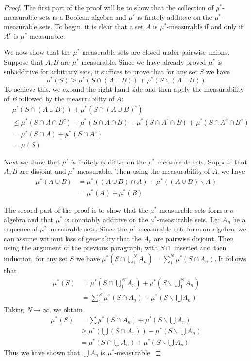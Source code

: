 \documentclass[11pt,oneside]{amsbook}
\renewcommand{\setminus}{\smallsetminus}
\theoremstyle{definition}
\theoremstyle{plain}
\theoremstyle{definition}
\theoremstyle{remark}
\numberwithin{equation}{section}
\numberwithin{figure}{section}
\begin{document}
\begin{proof}
  The first part of the proof will be to show that the collection of $\mu^*$-measurable sets is a Boolean algebra and $\mu^*$ is finitely additive on the $\mu^*$-measurable sets. To begin, it is clear that a set $A$ is $\mu^*$-measurable if and only if $A^c$ is $\mu^*$-measurable.

  We now show that the $\mu^*$-measurable sets are closed under pairwise unions. Suppose that $A,B$ are $\mu^*$-measurable. Since we have already proved $\mu^*$ is subadditive for arbitrary sets, it suffices to prove that for any set $S$ we have
  \[\mu^*(S)\geq\mu^*(S\cap(A\cup B))+\mu^*(S\setminus(A\cup B))
  \]
  To achieve this, we expand the right-hand side and then apply the measurability of $B$ followed by the measurability of $A$:
  \begin{align*}
    &\mu^*(S\cap(A\cup B))+\mu^*(S\cap(A\cup B)^c)\\
    &\leq \mu^*(S\cap A\cap B^c)+\mu^*(S\cap A\cap B)+\mu^*(S\cap A^c\cap B)+\mu^*(S\cap A^c\cap B^c)\\
    &=\mu^*(S\cap A)+\mu^*(S\cap A^c)\\
    &=\mu(S)
  \end{align*}

  Next we show that $\mu^*$ is finitely additive on the $\mu^*$-measurable sets. Suppose that $A,B$ are disjoint and $\mu^*$-measurable. Then using the measurability of $A$, we have
  \begin{align*}
    \mu^*(A\cup B)&=\mu^*((A\cup B)\cap A)+\mu^*((A\cup B)\setminus A)\\
                  &=\mu^*(A)+\mu^*(B)
  \end{align*}

  The second part of the proof is to show that the $\mu^*$-measurable sets form a $\sigma$-algebra and that $\mu^*$ is countably additive on the $\mu^*$-measurable sets. Let $A_n$ be a sequence of $\mu^*$-measurable sets. Since the $\mu^*$-measurable sets form an algebra, we can assume without loss of generality that the $A_n$ are pairwise disjoint. Then using the argument of the previous paragraph, with $S\cap$ inserted and then induction, for any set $S$ we have $\mu^*(S\cap\bigcup_1^N A_n)=\sum_1^N\mu^*(S\cap A_n)$. It follows that
  \begin{align*}
    \mu^*(S)&=\mu^*(S\cap\bigcup_1^N A_n)+\mu^*(S\setminus\bigcup_1^N A_n)\\
            &=\sum_1^N\mu^*(S\cap A_n)+\mu^*(S\setminus\bigcup A_n)
  \end{align*}
  Taking $N\to\infty$, we obtain
  \begin{align*}
    \mu^*(S)&=\sum\mu^*(S\cap A_n)+\mu^*(S\setminus\bigcup A_n)\\
            &\geq\mu^*(\bigcup (S\cap A_n))+\mu^*(S\setminus\bigcup A_n)\\
            &=\mu^*(S\cap\bigcup A_n)+\mu^*(S\setminus\bigcup A_n)
  \end{align*}
  Thus we have shown that $\bigcup A_n$ is $\mu^*$-measurable.


\end{proof}
\end{document}
